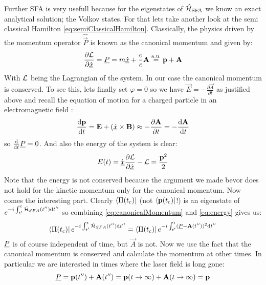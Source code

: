 Further SFA is very usefull because for the eigenstates of $\hat{\mathcal{H}}_{\mathrm{SFA}}$ we know an exact analytical solution; the Volkov states.
For that lets take another look at the semi classical Hamilton \eqref{eq:semiClassicalHamilton}. 
Classically, the physics driven by the momentum operator $\hat{\vec{P}}$ is known as the canonical momentum and given by:
\begin{equation}
    \frac{\partial \mathcal{L}}{\partial \dot{\underline{x}}} = \underline{P} = m\underline{\dot{x}} + \frac{e}{c}\mathbf{A} \stackrel{\mathrm{a.u.}}{=} \mathbf{p} + \mathbf{A}    \label{eq:canonicalMomentum}
\end{equation}
With $\mathcal{L}$ being the Lagrangian of the system.
In our case the canonical momentum is conserved. 
To see this, lets finally set $\varphi=0$ so we have $\vec{E} = -\frac{\partial \vec{A}}{\partial t}$ as justified above and recall the equation of motion for a charged particle in an electromagnetic field \cite{LandauLifschitzBand2}:
\begin{equation*}
    \frac{\dd\vec{p}}{\dd t} = \vec{E} + \left(\uvec{\dot{x}}\times\vec{B}\right) \approx -\frac{\partial \vec{A}}{\partial t} = -\frac{\dd \vec{A}}{\dd t}   %
\end{equation*}
so $\frac{\mathrm{d}}{\mathrm{d} t}\underline{P}=0$.
And also the energy of the system is clear:
\begin{equation}
    E(t) = \dot{\underline{x}}\frac{\partial \mathcal{L}}{\partial \dot{\underline{x}}}-\mathcal{L} = \frac{\mathbf{p}^2}{2}     \label{eq:energy}
\end{equation}
Note that the energy is not conserved because the argument we made bevor does not hold for the kinetic momentum only for the canonical momentum.
Now comes the interesting part. 
Clearly $\bra{\Pi(t_{\mathrm{c}})}$ (not $\bra{\mathbf{p}(t_{\mathrm{c}})}$!) is an eigenstate of $e^{-i \int_{t'}^{t} \hat{\mathcal{H}}_{SFA}(t'') \mathrm{d} t''}$ so combining \eqref{eq:canonicalMomentum} and \eqref{eq:energy} gives us:
\begin{equation*}
    \bra{\Pi(t_c)}e^{-i \int_{t'}^{t} \hat{\mathcal{H}}_{SFA}(t'') \mathrm{d} t''} = \bra{\Pi(t_c)}e^{-i \int_{t'}^{t} (\underline{P} - \mathbf{A}(t''))^2 \mathrm{d} t''}
\end{equation*}
$\underline{P}$ is of course independent of time, but $\vec{A}$ is not. 
Now we use the fact that the canonical momentum is conserved and calculate the momentum at other times.
In particular we are interested in times where the laser field is long gone:
\begin{equation*}
    \underline{P} = \mathbf{p}(t'') + \mathbf{A}(t'') = \mathbf{p}(t\rightarrow \infty) + \mathbf{A}(t\rightarrow \infty) = \mathbf{p}
\end{equation*}
